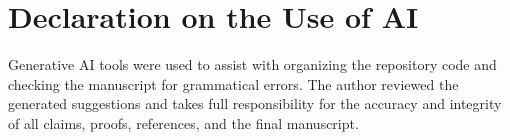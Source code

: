 \documentclass[10pt,journal,compsoc]{IEEEtran}
\theoremstyle{plain}
\theoremstyle{definition}
\begin{document}
\section*{Declaration on the Use of AI}
Generative AI tools were used to assist with organizing the repository code and checking the manuscript for grammatical errors. The author reviewed the generated suggestions and takes full responsibility for the accuracy and integrity of all claims, proofs, references, and the final manuscript.



\end{document}
